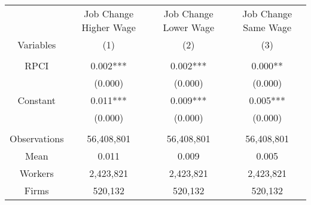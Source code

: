 \begin{tabular}{c|ccc}
\toprule
\toprule
      & Job Change Higher Wage & Job Change Lower Wage & Job Change Same Wage \\
Variables & (1)   & (2)   & (3) \\
\midrule
      &       &       &  \\
RPCI  & \multicolumn{1}{p{10.835em}}{0.002***} & \multicolumn{1}{p{10.835em}}{0.002***} & \multicolumn{1}{p{10.835em}}{0.000**} \\
      & (0.000) & (0.000) & (0.000) \\
Constant & \multicolumn{1}{p{10.835em}}{0.011***} & \multicolumn{1}{p{10.835em}}{0.009***} & \multicolumn{1}{p{10.835em}}{0.005***} \\
      & (0.000) & (0.000) & (0.000) \\
      &       &       &  \\
\midrule
Observations & 56,408,801 & 56,408,801 & 56,408,801 \\
Mean  & 0.011 & 0.009 & 0.005 \\
Workers & 2,423,821 & 2,423,821 & 2,423,821 \\
Firms & 520,132 & 520,132 & 520,132 \\
\bottomrule
\bottomrule
\end{tabular}%
